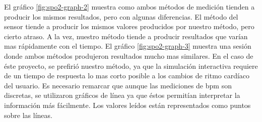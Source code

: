 El gráfico \ref{fig:spo2-graph-2} muestra como ambos métodos de medición tienden a producir los mismos resultados, pero con algunas diferencias. El método del sensor tiende a producir los mismos valores producidos por nuestro método, pero cierto atraso. A la vez, nuestro método tiende a producir resultados que varían mas rápidamente con el tiempo. El gráfico \ref{fig:spo2-graph-3} muestra una sesión donde ambos métodos produjeron resultados mucho mas similares. En el caso de éste proyecto, se prefirió nuestro método, ya que la simulación interactiva requiere de un tiempo de respuesta lo mas corto posible a los cambios de ritmo cardíaco del usuario. Es necesario remarcar que aunque las mediciones de \acrshort{bpm} son discretas, se utilizaron gráficos de línea ya que éstos permitían interpretar la información más fácilmente. Los valores leídos están representados como puntos sobre las líneas.

